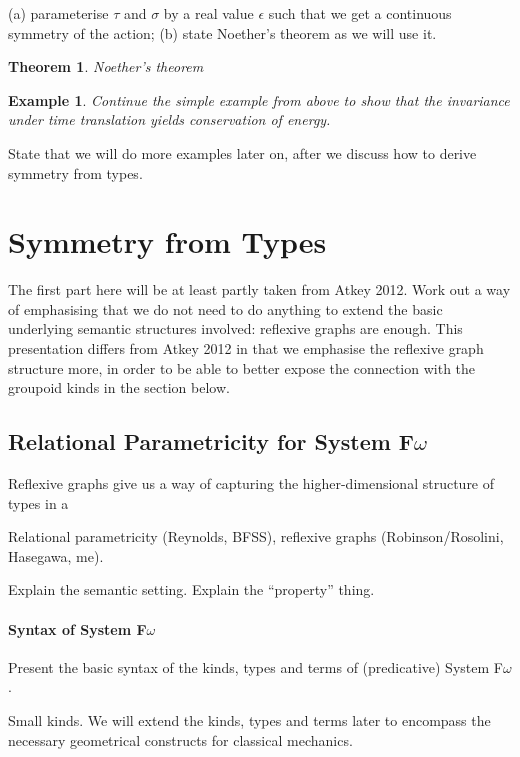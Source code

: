 \documentclass[preprint]{sigplanconf}
\newtheorem{theorem}{Theorem}
\theoremstyle{examplestyle}
\newtheorem{example}{Example}
\begin{document}
(a) parameterise $\tau$ and $\sigma$ by a real value $\epsilon$ such
that we get a continuous symmetry of the action; (b) state Noether's
theorem as we will use it.

\begin{theorem}
  Noether's theorem
\end{theorem}

\begin{example}
  Continue the simple example from above to show that the invariance
  under time translation yields conservation of energy.
\end{example}

State that we will do more examples later on, after we discuss how to
derive symmetry from types.

\section{Symmetry from Types}

The first part here will be at least partly taken from Atkey
2012. Work out a way of emphasising that we do not need to do anything
to extend the basic underlying semantic structures involved: reflexive
graphs are enough. This presentation differs from Atkey 2012 in that
we emphasise the reflexive graph structure more, in order to be able
to better expose the connection with the groupoid kinds in the section
below.

\subsection{Relational Parametricity for System F$\omega$}
\label{sec:refl-graphs-for-fomega}

Reflexive graphs give us a way of capturing the higher-dimensional
structure of types in a 

Relational parametricity (Reynolds, BFSS), reflexive graphs
(Robinson/Rosolini, Hasegawa, me).

Explain the semantic setting. Explain the ``property'' thing.

\paragraph{Syntax of System F$\omega$} Present the basic syntax of the
kinds, types and terms of (predicative) System F$\omega$.

Small kinds. We will extend the kinds, types and terms later to
encompass the necessary geometrical constructs for classical
mechanics.
\end{document}
